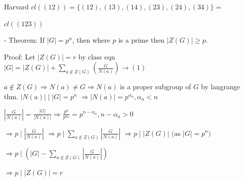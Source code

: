 Harvard
$cl((12)) = \{(12), (13), (14), (23), (24), (34)\} = $

$cl((123))$

- Theorem: If $|G| = p^n$, then where $p$ is a prime then $|Z(G)| \ge p$.

Proof: Let $|Z(G)| = r$
by class eqn
$|G| = |Z(G)| + \sum_{a \notin Z(G)} \left(\frac{G}{N(a)}\right) \to (1)$

$a \notin Z(G) \Rightarrow N(a) \neq G \Rightarrow N(a)$ is a proper subgroup of $G$
by langrange thm. $|N(a)| \mid |G| = p^n$
$\Rightarrow |N(a)| = p^{\alpha_a}, \alpha_a < n$

$\left|\frac{G}{N(a)}\right| = \frac{|G|}{|N(a)|} \Rightarrow \frac{p^n}{p^{\alpha_a}} = p^{n - \alpha_a}, n - \alpha_a > 0$

$\Rightarrow p \mid \left|\frac{G}{N(a)}\right|$
$\Rightarrow p \mid \sum_{a \notin Z(G)} \left|\frac{G}{N(a)}\right|$
$\Rightarrow p \mid |Z(G)| \text{ (as } |G| = p^n)$

$\Rightarrow p \mid \left(|G| - \sum_{a \notin Z(G)} \left|\frac{G}{N(a)}\right|\right)$

$\Rightarrow p \mid |Z(G)| = r$
